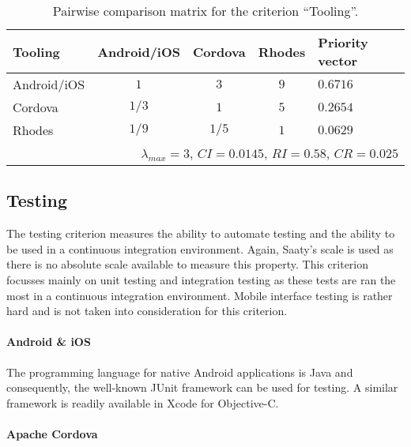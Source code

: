 \begin{table}[h!]
    \begin{center}
        \begin{tabular}{lcccl}
            \hline
            \textbf{Tooling} & Android/iOS & Cordova & Rhodes & Priority vector \\
            \hline
            Android/iOS      & $1$         & $3$     & $9$    & $0.6716$        \\
            Cordova          & $1/3$       & $1$     & $5$    & $0.2654$        \\
            Rhodes           & $1/9$       & $1/5$   & $1$    & $0.0629$        \\
            \hline
            \multicolumn{5}{r}{$\lambda_{max} = 3$, $CI = 0.0145$, $RI = 0.58$, $CR = 0.025$}\\
            \hline
        \end{tabular}
        \caption{Pairwise comparison matrix for the criterion ``Tooling''.}
        \label{tab:tooling}
    \end{center}
\end{table}

\subsection{Testing}

The testing criterion measures the ability to automate testing and the ability to be used in a continuous integration environment. Again, Saaty's scale is used as there is no absolute scale available to measure this property. This criterion focusses mainly on unit testing and integration testing as these tests are ran the most in a continuous integration environment. Mobile interface testing is rather hard and is not taken into consideration for this criterion.

\paragraph{Android \& iOS} The programming language for native Android applications is Java and consequently, the well-known JUnit framework can be used for testing. A similar framework is readily available in Xcode for Objective-C.

\paragraph{Apache Cordova} 

